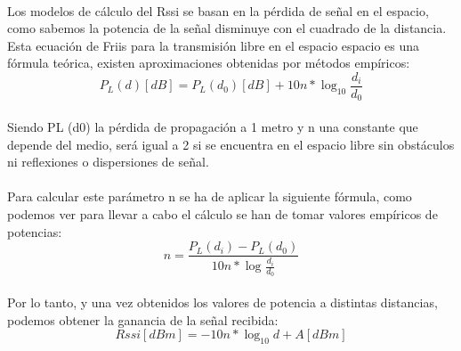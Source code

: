 \documentclass[paper=a4, fontsize=11pt,twoside]{scrartcl}	%
\begin{document}
            \paragraph{}
            Los modelos de cálculo del Rssi se basan en la pérdida de señal en el espacio, como sabemos la potencia de la señal
            disminuye con el cuadrado de la distancia. Esta ecuación de Friis para la transmisión libre en el espacio espacio es 
            una fórmula teórica, existen aproximaciones obtenidas por métodos empíricos:
            \begin{equation}
                P_L(d) [dB] = P_L(d_0) [dB] + 10n * \log_{10} \frac{d_i}{d_0} 
            \end{equation}
            \paragraph{}
            Siendo PL (d0) la pérdida de propagación a 1 metro y n una constante que depende del medio, será igual
            a 2 si se encuentra en el espacio libre sin obstáculos ni reflexiones o dispersiones de señal.
            \paragraph{}
            Para calcular este parámetro n se ha de aplicar la siguiente fórmula, como podemos ver para llevar a cabo el 
            cálculo se han de tomar valores empíricos de potencias:
            \begin{equation}
                n = \frac{ P_L(d_i) - P_L(d_0) }{10n*\log_{}\frac{d_i}{d_0}}
            \end{equation}
            \paragraph{}
            Por lo tanto, y una vez obtenidos los valores de potencia a distintas distancias, podemos obtener la ganancia
            de la señal recibida:
            \begin{equation}
                Rssi [dBm] = -10n*\log_{10} d+ A[dBm]
            \end{equation}
\end{document}
